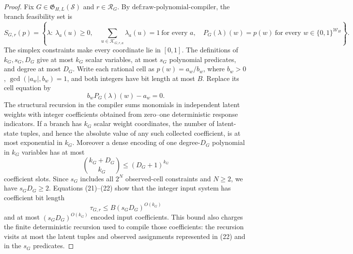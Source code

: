 \documentclass{article}
\begin{document}
\begin{proof}
Fix \(G\in\mathfrak G_{H,L}(\mathcal S)\) and \(r\in\mathcal R_G\).  By \(\text{def:raw-polynomial-compiler}\), the branch feasibility set is
\[
S_{G,r}(p)=\left\{\lambda:\
\lambda_a(u)\ge0,\quad
\sum_{u\in\mathcal K_{G,r,a}}\lambda_a(u)=1\ \text{for every }a,\quad
P_G(\lambda)(w)=p(w)\ \text{for every }w\in\{0,1\}^{\mathcal W_H}
\right\}.
\tag{20}
\]
The simplex constraints make every coordinate lie in \([0,1]\).  The definitions of \(k_G,s_G,D_G\) give at most \(k_G\) scalar variables, at most \(s_G\) polynomial predicates, and degree at most \(D_G\).  Write each rational cell as \(p(w)=a_w/b_w\), where \(b_w>0\), \(\gcd(|a_w|,b_w)=1\), and both integers have bit length at most \(B\).  Replace its cell equation by
\[
b_wP_G(\lambda)(w)-a_w=0.
\tag{21}
\]
The structural recursion in the compiler sums monomials in independent latent weights with integer coefficients obtained from zero--one deterministic response indicators.  If a branch has \(k_G\) scalar weight coordinates, the number of latent-state tuples, and hence the absolute value of any such collected coefficient, is at most exponential in \(k_G\).  Moreover a dense encoding of one degree-\(D_G\) polynomial in \(k_G\) variables has at most
\[
\binom{k_G+D_G}{k_G}\le(D_G+1)^{k_G}
\tag{22}
\]
coefficient slots.  Since \(s_G\) includes all \(2^N\) observed-cell constraints and \(N\ge2\), we have \(s_GD_G\ge2\).  Equations (21)--(22) show that the integer input system has coefficient bit length
\[
\tau_{G,r}\le B(s_GD_G)^{O(k_G)}
\tag{23}
\]
and at most \((s_GD_G)^{O(k_G)}\) encoded input coefficients.  This bound also charges the finite deterministic recursion used to compile those coefficients: the recursion visits at most the latent tuples and observed assignments represented in (22) and in the \(s_G\) predicates.


\end{proof}
\end{document}
